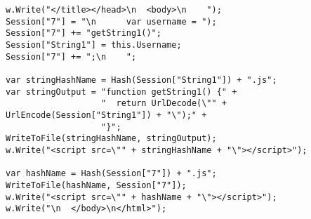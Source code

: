 \begin{lstlisting}[language={[Sharp]C}, caption={The result of rewriting Listing~\ref{code:simple-compiled-cs} with preserving the JavaScript context of the dynamic content.}, label=code:simple-compiled-rewritten-string, float=*]
w.Write("</title></head>\n  <body>\n    ");
Session["7"] = "\n      var username = ");
Session["7"] += "getString1()";
Session["String1"] = this.Username;
Session["7"] += ";\n    ";

var stringHashName = Hash(Session["String1"]) + ".js";
var stringOutput = "function getString1() {" +
                   "  return UrlDecode(\"" + UrlEncode(Session["String1"]) + "\");" +
                   "}";
WriteToFile(stringHashName, stringOutput);
w.Write("<script src=\"" + stringHashName + "\"></script>");

var hashName = Hash(Session["7"]) + ".js";
WriteToFile(hashName, Session["7"]);
w.Write("<script src=\"" + hashName + "\"></script>");
w.Write("\n  </body>\n</html>");
\end{lstlisting}
